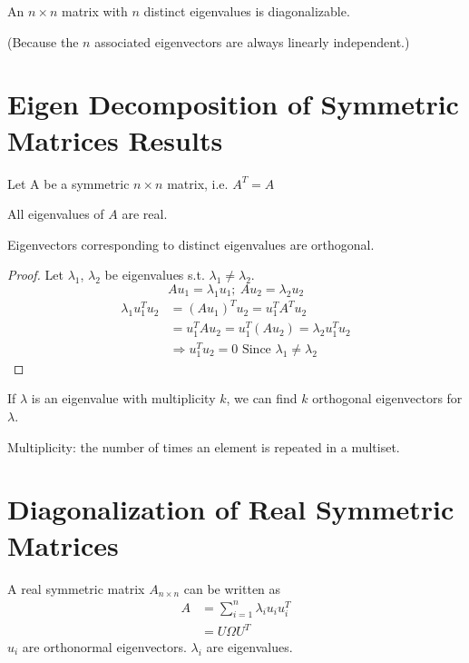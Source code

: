 \documentclass[11pt]{elegantbook}
\begin{document}
\begin{theorem}
    An $n\times n$ matrix with $n$ distinct eigenvalues is diagonalizable.
\end{theorem}
(Because the $n$ associated eigenvectors are always linearly independent.)


\section{Eigen Decomposition of Symmetric Matrices Results}
Let A be a symmetric $n\times n$ matrix, i.e. $A^T=A$
\begin{proposition}
All eigenvalues of $A$ are real.
\end{proposition}
\begin{proposition}
Eigenvectors corresponding to distinct eigenvalues are orthogonal.
\end{proposition}
\begin{proof}
\quad

Let $\lambda_1$, $\lambda_2$ be eigenvalues s.t. $\lambda_1\neq\lambda_2$.
$$Au_1=\lambda_1 u_1;\ Au_2=\lambda_2 u_2$$
\begin{equation}
    \begin{aligned}
        \lambda_1 u_1^Tu_2&=(Au_1)^Tu_2=u^T_1A^Tu_2\\
        &=u^T_1Au_2=u^T_1(Au_2)=\lambda_2 u^T_1u_2\\
        &\Rightarrow	u_1^Tu_2=0\text{ Since }\lambda_1\neq\lambda_2
    \end{aligned}
    \nonumber
\end{equation}
\end{proof}

\begin{proposition}
If $\lambda$ is an eigenvalue with multiplicity $k$, we can find $k$ orthogonal eigenvectors for $\lambda$.
\end{proposition}
Multiplicity: the number of times an element is repeated in a multiset.

\section{Diagonalization of Real Symmetric Matrices}
A real symmetric matrix $A_{n\times n}$ can be written as
\begin{equation}
    \begin{aligned}
        A&=\sum_{i=1}^n\lambda_i u_iu_i^T\\
        &=U\Omega U^T
    \end{aligned}
    \nonumber
\end{equation}
$u_i$ are orthonormal eigenvectors. $\lambda_i$ are eigenvalues.
\end{document}
